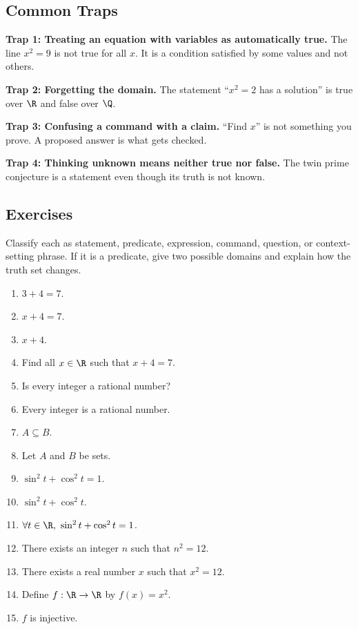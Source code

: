 \subsection{Common Traps}

\begin{trapbox}
\textbf{Trap 1: Treating an equation with variables as automatically true.}
The line $x^2=9$ is not true for all $x$. It is a condition satisfied by some values and not others.

\textbf{Trap 2: Forgetting the domain.}
The statement ``$x^2=2$ has a solution'' is true over $\R$ and false over $\Q$.

\textbf{Trap 3: Confusing a command with a claim.}
``Find $x$'' is not something you prove. A proposed answer is what gets checked.

\textbf{Trap 4: Thinking unknown means neither true nor false.}
The twin prime conjecture is a statement even though its truth is not known.
\end{trapbox}

\subsection{Exercises}

Classify each as statement, predicate, expression, command, question, or context-setting phrase. If it is a predicate, give two possible domains and explain how the truth set changes.

\begin{enumerate}
\item $3+4=7$.
\item $x+4=7$.
\item $x+4$.
\item Find all $x\in\R$ such that $x+4=7$.
\item Is every integer a rational number?
\item Every integer is a rational number.
\item $A\subseteq B$.
\item Let $A$ and $B$ be sets.
\item $\sin^2 t+\cos^2 t=1$.
\item $\sin^2 t+\cos^2 t$.
\item $\forall t\in\R,\ \sin^2 t+\cos^2 t=1$.
\item There exists an integer $n$ such that $n^2=12$.
\item There exists a real number $x$ such that $x^2=12$.
\item Define $f:\R\to\R$ by $f(x)=x^2$.
\item $f$ is injective.
\end{enumerate}

